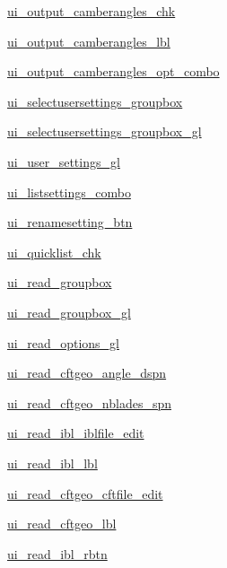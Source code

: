 \begin{DoxyCompactItemize}
\item 
\hyperlink{a00074_a6250f7ec5670033a6994818abf3d9b15}{ui\+\_\+output\+\_\+camberangles\+\_\+chk}
\item 
\hyperlink{a00074_ae0b09533ea5d38dcba89c010fcdc7886}{ui\+\_\+output\+\_\+camberangles\+\_\+lbl}
\item 
\hyperlink{a00074_a8c262e36d39977da647517cb97b7ab86}{ui\+\_\+output\+\_\+camberangles\+\_\+opt\+\_\+combo}
\item 
\hyperlink{a00074_a868061df5f5e844caea1728de203129e}{ui\+\_\+selectusersettings\+\_\+groupbox}
\item 
\hyperlink{a00074_a5a42530f0dd7f8e7c2da3074565220be}{ui\+\_\+selectusersettings\+\_\+groupbox\+\_\+gl}
\item 
\hyperlink{a00074_aa064aa43c06b096e6d2753909fddf376}{ui\+\_\+user\+\_\+settings\+\_\+gl}
\item 
\hyperlink{a00074_a1ac2324eaa26fdc7d7a038b7df328a0d}{ui\+\_\+listsettings\+\_\+combo}
\item 
\hyperlink{a00074_a720608a6cc8575e078cd4e807dfe1031}{ui\+\_\+renamesetting\+\_\+btn}
\item 
\hyperlink{a00074_af95ad0699234293c4dbeaa2fbf3af607}{ui\+\_\+quicklist\+\_\+chk}
\item 
\hyperlink{a00074_afd5486e4e3b6a77faf883e45beab9a09}{ui\+\_\+read\+\_\+groupbox}
\item 
\hyperlink{a00074_ad90bdfb90daa3db5b3f49ae0b8d8fa8e}{ui\+\_\+read\+\_\+groupbox\+\_\+gl}
\item 
\hyperlink{a00074_a7704bdcb5a1c0e19f4cd1c19c2000b62}{ui\+\_\+read\+\_\+options\+\_\+gl}
\item 
\hyperlink{a00074_a7bfc8ae9b8e66f044f312dbb91219d88}{ui\+\_\+read\+\_\+cftgeo\+\_\+angle\+\_\+dspn}
\item 
\hyperlink{a00074_a96dfb7bb6ab5a36c649090a3d1178c74}{ui\+\_\+read\+\_\+cftgeo\+\_\+nblades\+\_\+spn}
\item 
\hyperlink{a00074_a28522bd8330277ba8a1f01fa736cc82f}{ui\+\_\+read\+\_\+ibl\+\_\+iblfile\+\_\+edit}
\item 
\hyperlink{a00074_a297dda79cc86d653c2ba1f5bdef3b70e}{ui\+\_\+read\+\_\+ibl\+\_\+lbl}
\item 
\hyperlink{a00074_a5da571d939521a997ec7b05cd5bd7091}{ui\+\_\+read\+\_\+cftgeo\+\_\+cftfile\+\_\+edit}
\item 
\hyperlink{a00074_abcf4d4a107f41021d2904f09770d747b}{ui\+\_\+read\+\_\+cftgeo\+\_\+lbl}
\item 
\hyperlink{a00074_a94bf4df4cc948d1a55752fa45b97099b}{ui\+\_\+read\+\_\+ibl\+\_\+rbtn}

\end{DoxyCompactItemize}

